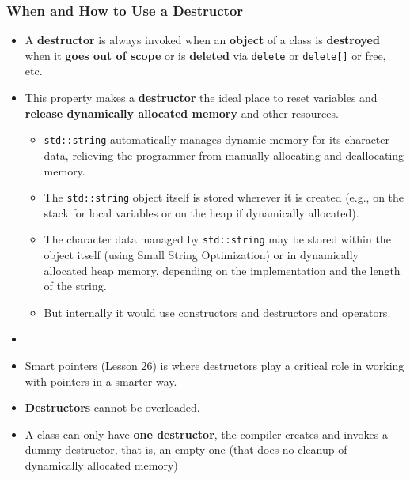 \documentclass[10pt]{article}
\newcommand{\pbreak}{\vspace{30pt}}
\begin{document}
\subsubsection{When and How to Use a Destructor}
\begin{itemize}
	\item A \textbf{destructor} is always invoked when an \textbf{object} of a class is \textbf{destroyed} when it \textbf{goes out of scope} or is \textbf{deleted} via \verb|delete| or \verb|delete[]| or free, etc.

	\item This property makes a \textbf{destructor} the ideal place to reset variables and \textbf{release dynamically allocated memory} and other resources.	 

\begin{itemize}
    \item \verb|std::string| automatically manages dynamic memory for its character data, relieving the programmer from manually allocating and deallocating memory.
    \item The \verb|std::string| object itself is stored wherever it is created (e.g., on the stack for local variables or on the heap if dynamically allocated).
    \item The character data managed by \verb|std::string| may be stored within the object itself (using Small String Optimization) or in dynamically allocated heap memory, depending on the implementation and the length of the string.

	\item But internally it would use constructors and destructors and operators.
\end{itemize}

\pbreak
\item {}

\item Smart pointers (Lesson 26) is where destructors play a critical role in working with pointers in a smarter way.

\item \textbf{Destructors} \underline{cannot be overloaded}.

\item A class can only have \textbf{one destructor}, the compiler creates and invokes a dummy destructor, that is, an empty one (that does no cleanup of dynamically allocated memory)

\end{itemize}
\end{document}
